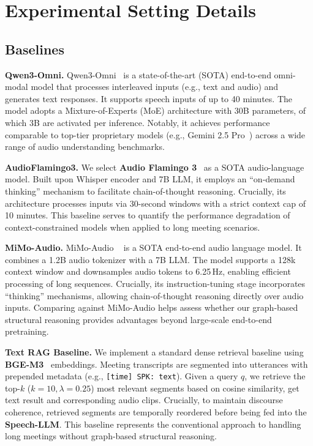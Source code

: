 \documentclass[11pt]{article}
\begin{document}
\section{Experimental Setting Details}
\label{experimental_details}
\subsection{Baselines}

\textbf{Qwen3-Omni.}
Qwen3-Omni~\cite{Qwen3-Omni} is a state-of-the-art (SOTA) end-to-end omni-modal model that processes interleaved inputs (e.g., text and audio) and generates text responses. It supports speech inputs of up to 40 minutes. The model adopts a Mixture-of-Experts (MoE) architecture with 30B parameters, of which 3B are activated per inference. Notably, it achieves performance comparable to top-tier proprietary models (e.g., Gemini 2.5 Pro~\cite{comanici2025gemini25pushingfrontier}) across a wide range of audio understanding benchmarks.

\textbf{AudioFlamingo3.} 
We select \textbf{Audio Flamingo 3}~\cite{goel2025audioflamingo3advancing} as a SOTA audio-language model. 
Built upon Whisper encoder and 7B LLM, it employs an ``on-demand thinking'' mechanism to facilitate chain-of-thought reasoning. 
Crucially, its architecture processes inputs via 30-second windows with a strict context cap of 10 minutes. 
This baseline serves to quantify the performance degradation of context-constrained models when applied to long meeting scenarios.


\textbf{MiMo-Audio.}
MiMo-Audio ~\cite{coreteam2025mimoaudio} is a SOTA end-to-end audio language model. It combines a 1.2B audio tokenizer with a 7B LLM. The model supports a 128k context window and downsamples audio tokens to 6.25\,Hz, enabling efficient processing of long sequences. Crucially, its instruction-tuning stage incorporates ``thinking'' mechanisms, allowing chain-of-thought reasoning directly over audio inputs. Comparing against MiMo-Audio helps assess whether our graph-based structural reasoning provides advantages beyond large-scale end-to-end pretraining.

\textbf{Text RAG Baseline.}
We implement a standard dense retrieval baseline using \textbf{BGE-M3}~\cite{chen2024bgem3embeddingmultilingualmultifunctionality} embeddings. 
Meeting transcripts are segmented into utterances with prepended metadata (e.g., \texttt{[time] SPK: text}). 
Given a query $q$, we retrieve the top-$k$ ($k=10, \lambda=0.25$) most relevant segments based on cosine similarity, get text result and corresponding audio clips. 
Crucially, to maintain discourse coherence, retrieved segments are temporally reordered before being fed into the \textbf{Speech-LLM}. 
This baseline represents the conventional approach to handling long meetings without graph-based structural reasoning.
\end{document}

